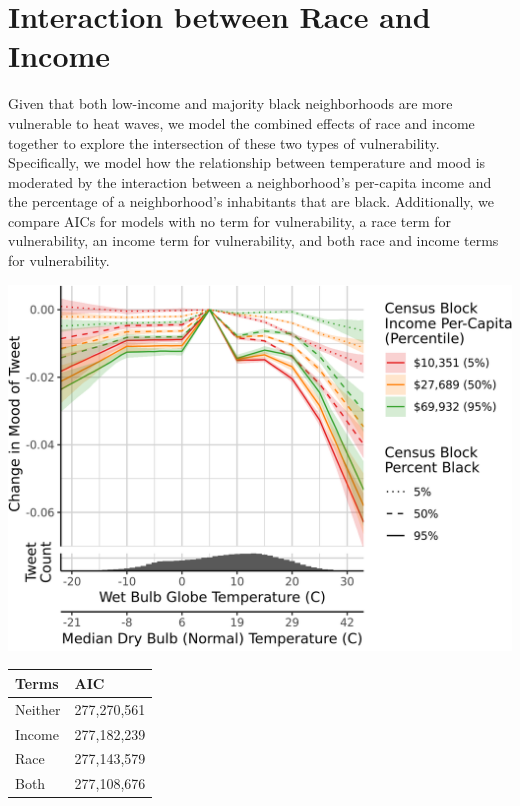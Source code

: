 \documentclass[9pt,twoside,lineno]{pnas-new}
\begin{document}
\section*{Interaction between Race and Income}
Given that both low-income and majority black neighborhoods are more vulnerable to heat waves, we model the combined effects of race and income together to explore the intersection of these two types of vulnerability. Specifically, we model how the relationship between temperature and mood is moderated by the interaction between a neighborhood's per-capita income and the percentage of a neighborhood's inhabitants that are black. Additionally, we compare AICs for models with no term for vulnerability, a race term for vulnerability, an income term for vulnerability, and both race and income terms for vulnerability.

\begin{minipage}{.65\textwidth}
\centering
\includegraphics[width=\textwidth]{../../../res/wbgt-income-race.png}
\label{fig:race-income}
\end{minipage}\hfill
\begin{minipage}{.35\textwidth}
\centering
\begin{tabular}{| l | l |}
\hline
Terms & AIC \\
\hline
Neither & 277,270,561 \\
Income & 277,182,239 \\
Race & 277,143,579 \\
Both & 277,108,676 \\
\hline
\end{tabular}
\label{tab:aics}
\end{minipage}
\end{document}

